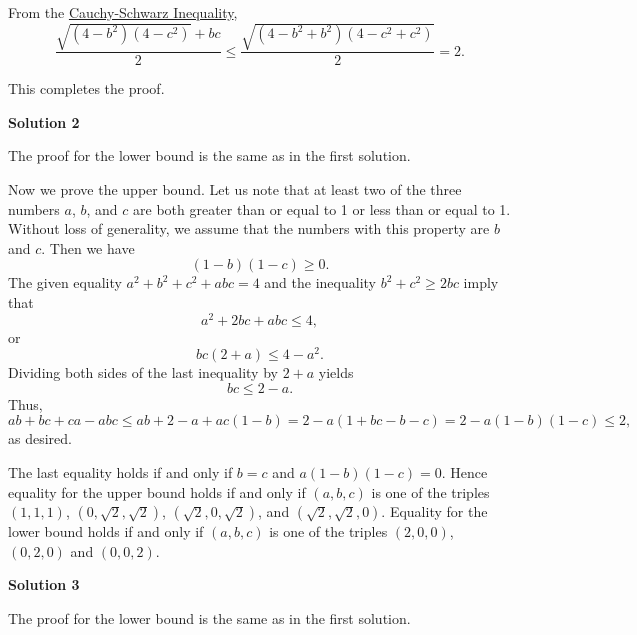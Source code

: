 \begin{enumerate}
 From the \href{https://artofproblemsolving.com/wiki/index.php?title=Cauchy-Schwarz\_Inequality}{Cauchy-Schwarz Inequality},
 \[\frac{\sqrt{(4-b^2)(4-c^2)} + bc}{2} \le \frac{\sqrt{(4-b^2+b^2)(4-c^2+c^2)} }{2} = 2.\]

 This completes the proof.

 



\textbf{Solution 2}

The proof for the lower bound is the same as in the first solution.

 Now we prove the upper bound. Let us note that at least two of the three numbers $a$, $b$, and $c$ are both greater than or equal to 1 or less than or equal to 1. Without loss of generality, we assume that the numbers with this property are $b$ and $c$. Then we have
 \[(1 - b)(1 - c)\geq 0.\]The given equality $a^2 + b^2 + c^2 + abc = 4$ and the inequality $b^2 + c^2\geq 2bc$ imply that
 \[a^2 + 2bc + abc\leq 4,\]or
 \[bc(2 + a)\leq 4 - a^2.\]Dividing both sides of the last inequality by $2 + a$ yields
 \[bc\leq 2 - a.\]Thus,
 \[ab + bc + ca - abc\leq ab + 2 - a + ac(1 - b) = 2 - a(1 + bc - b - c) = 2 - a(1 - b)(1 - c)\leq 2,\]as desired.

 The last equality holds if and only if $b = c$ and $a(1 - b)(1 - c) = 0$. Hence equality for the upper bound holds if and only if $(a,b,c)$ is one of the triples $(1,1,1)$, $(0,\sqrt{2},\sqrt{2})$, $(\sqrt{2},0,\sqrt{2})$, and $(\sqrt{2},\sqrt{2},0)$. Equality for the lower bound holds if and only if $(a,b,c)$ is one of the triples $(2,0,0)$, $(0,2,0)$ and $(0,0,2)$.

 



\textbf{Solution 3}

The proof for the lower bound is the same as in the first solution.


\end{enumerate}
